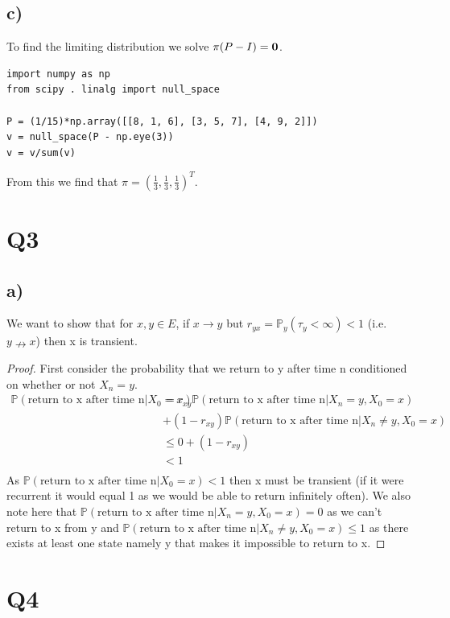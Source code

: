 \documentclass{article}
\begin{document}
\subsection*{c)}
To find the limiting distribution we solve $\pi(P-I)=\bold{0}$.
\begin{lstlisting}
import numpy as np
from scipy . linalg import null_space

P = (1/15)*np.array([[8, 1, 6], [3, 5, 7], [4, 9, 2]])
v = null_space(P - np.eye(3))
v = v/sum(v)
\end{lstlisting}
From this we find that $\pi=\left(\frac{1}{3},\frac{1}{3},\frac{1}{3}\right)^T$.
\section*{Q3}
\subsection*{a)}
We want to show that for $x,y\in E$, if $x\rightarrow y$ but $r_{yx}=\mathbb{P}_y(\tau_y<\infty)<1$ (i.e. $y\nrightarrow x$) then x is transient.
\begin{proof}
First consider the probability that we return to y after time n conditioned on whether or not $X_n=y$.
\begin{align*}
\mathbb{P}(\text{return to x after time n}|X_0=x)&=r_{xy}\mathbb{P}(\text{return to x after time n}|X_n=y,X_0=x)\\
&+(1-r_{xy})\mathbb{P}(\text{return to x after time n}|X_n\neq y,X_0=x)\\
&\leq 0+(1-r_{xy})\\
&<1\\
\end{align*}
As $\mathbb{P}(\text{return to x after time n}|X_0=x)<1$ then x must be transient (if it were recurrent it would equal 1 as we would be able to return infinitely often). We also note here that $\mathbb{P}(\text{return to x after time n}|X_n=y,X_0=x)=0$ as we can't return to x from y and $\mathbb{P}(\text{return to x after time n}|X_n\neq y,X_0=x)\leq 1$ as there exists at least one state namely y that makes it impossible to return to x.
\end{proof}
\section*{Q4}
\end{document}
